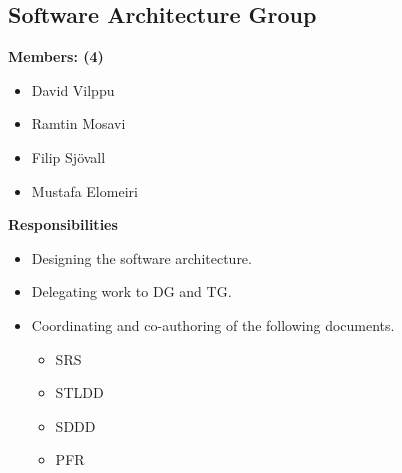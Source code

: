 \documentclass{article}
\begin{document}
    \subsection{Software Architecture Group}
        \textbf{Members: (4)}
        \begin{itemize}
            \item David Vilppu
            \item Ramtin Mosavi
            \item Filip Sjövall
            \item Mustafa Elomeiri
        \end{itemize}
        \textbf{Responsibilities}
        \begin{itemize}
            \item Designing the software architecture.
            \item Delegating work to DG and TG.
            \item Coordinating and co-authoring of the following documents.
                \begin{itemize}
                    \item SRS
                    \item STLDD
                    \item SDDD
                    \item PFR
                \end{itemize} 
        \end{itemize}
 
\end{document}
